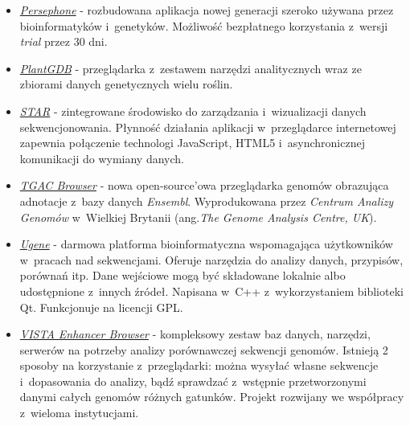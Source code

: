 \documentclass[a4paper,12pt,oneside]{mwrep}  %
\begin{document}
\begin{itemize}
\item \href{http://persephone.net/}{\emph{Persephone}} - rozbudowana aplikacja nowej generacji szeroko używana przez bioinformatyków i~genetyków. Możliwość bezpłatnego korzystania z~wersji \emph{trial} przez 30 dni.

\item \href{http://www.plantgdb.org/}{\emph{PlantGDB}} - przeglądarka z~zestawem narzędzi analitycznych wraz ze zbiorami danych genetycznych wielu roślin.

\item \href{http://tabit.ucsd.edu/}{\emph{STAR}} - zintegrowane środowisko do zarządzania i~wizualizacji danych sekwencjonowania. Płynność działania aplikacji w~przeglądarce internetowej zapewnia połączenie technologi JavaScript, HTML5 i~asynchronicznej komunikacji do wymiany danych. 

\item \href{http://tgac-browser.tgac.ac.uk/}{\emph{TGAC Browser}} - nowa open-source'owa przeglądarka genomów obrazująca adnotacje z~bazy danych \emph{Ensembl}. Wyprodukowana przez \emph{Centrum Analizy Genomów} w~Wielkiej Brytanii (ang.\emph{The Genome Analysis Centre, UK}).

\item \href{http://ugene.net/}{\emph{Ugene}} - darmowa platforma bioinformatyczna wspomagająca użytkowników w~pracach nad sekwencjami. Oferuje narzędzia do analizy danych, przypisów, porównań itp. Dane wejściowe mogą być składowane lokalnie albo udostępnione z~innych źródeł. Napisana w~C++ z~wykorzystaniem biblioteki Qt. Funkcjonuje na licencji GPL.

\item \href{http://enhancer.lbl.gov/}{\emph{VISTA Enhancer Browser}} - kompleksowy zestaw baz danych, narzędzi, serwerów na potrzeby analizy porównawczej sekwencji genomów. Istnieją 2 sposoby na korzystanie z~przeglądarki: można wysyłać własne sekwencje i~dopasowania do analizy, bądź sprawdzać z~wstępnie przetworzonymi danymi całych genomów różnych gatunków. Projekt rozwijany we współpracy z~wieloma instytucjami.


\end{itemize}
\end{document}
